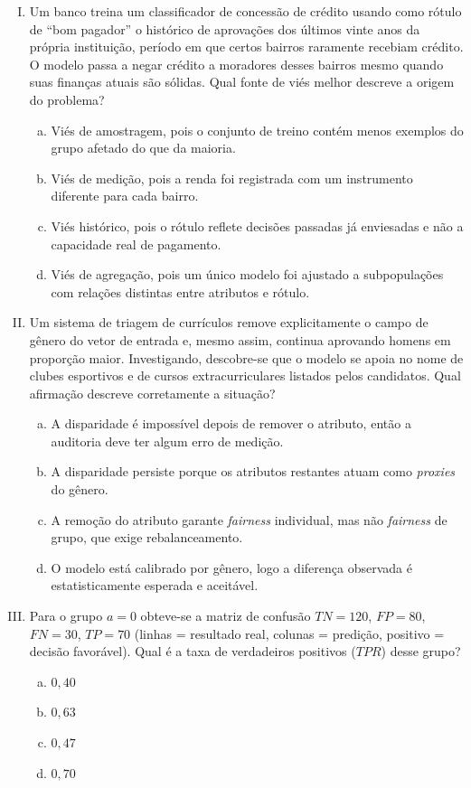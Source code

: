 \documentclass{dlproblemset}
\begin{document}
\begin{enumerate}[I)]

    \item Um banco treina um classificador de concessão de crédito usando como rótulo de ``bom pagador'' o histórico de aprovações dos últimos vinte anos da própria instituição, período em que certos bairros raramente recebiam crédito. O modelo passa a negar crédito a moradores desses bairros mesmo quando suas finanças atuais são sólidas. Qual fonte de viés melhor descreve a origem do problema?
    \begin{enumerate}[(a)]
        \item Viés de amostragem, pois o conjunto de treino contém menos exemplos do grupo afetado do que da maioria.
        \item Viés de medição, pois a renda foi registrada com um instrumento diferente para cada bairro.
        \item Viés histórico, pois o rótulo reflete decisões passadas já enviesadas e não a capacidade real de pagamento.
        \item Viés de agregação, pois um único modelo foi ajustado a subpopulações com relações distintas entre atributos e rótulo.
    \end{enumerate}

    \item Um sistema de triagem de currículos remove explicitamente o campo de gênero do vetor de entrada e, mesmo assim, continua aprovando homens em proporção maior. Investigando, descobre-se que o modelo se apoia no nome de clubes esportivos e de cursos extracurriculares listados pelos candidatos. Qual afirmação descreve corretamente a situação?
    \begin{enumerate}[(a)]
        \item A disparidade é impossível depois de remover o atributo, então a auditoria deve ter algum erro de medição.
        \item A disparidade persiste porque os atributos restantes atuam como \textit{proxies} do gênero.
        \item A remoção do atributo garante \textit{fairness} individual, mas não \textit{fairness} de grupo, que exige rebalanceamento.
        \item O modelo está calibrado por gênero, logo a diferença observada é estatisticamente esperada e aceitável.
    \end{enumerate}

    \item Para o grupo $a{=}0$ obteve-se a matriz de confusão $TN=120$, $FP=80$, $FN=30$, $TP=70$ (linhas = resultado real, colunas = predição, positivo = decisão favorável). Qual é a taxa de verdadeiros positivos ($TPR$) desse grupo?
    \begin{enumerate}[(a)]
        \item $0{,}40$
        \item $0{,}63$
        \item $0{,}47$
        \item $0{,}70$
    \end{enumerate}


\end{enumerate}
\end{document}
